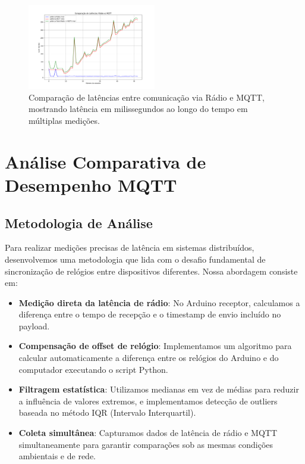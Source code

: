 \documentclass[hidelinks]{sbrt}
\begin{document}
\begin{figure}[H]
  \centering 
  \includegraphics[width=0.5\textwidth]{comparacao_latencias.png}
  \caption{Comparação de latências entre comunicação via Rádio e MQTT, mostrando latência em milissegundos ao longo do tempo em múltiplas medições.}
  \label{fig:comparacao_latencias}
\end{figure}

\section{Análise Comparativa de Desempenho MQTT}
\label{sec:III}

\subsection{Metodologia de Análise}

Para realizar medições precisas de latência em sistemas distribuídos, desenvolvemos uma metodologia que lida com o desafio fundamental de sincronização de relógios entre dispositivos diferentes. Nossa abordagem consiste em:

\begin{itemize}
    \item \textbf{Medição direta da latência de rádio}: No Arduino receptor, calculamos a diferença entre o tempo de recepção e o timestamp de envio incluído no payload.
    
    \item \textbf{Compensação de offset de relógio}: Implementamos um algoritmo para calcular automaticamente a diferença entre os relógios do Arduino e do computador executando o script Python.
    
    \item \textbf{Filtragem estatística}: Utilizamos medianas em vez de médias para reduzir a influência de valores extremos, e implementamos detecção de outliers baseada no método IQR (Intervalo Interquartil).
    
    \item \textbf{Coleta simultânea}: Capturamos dados de latência de rádio e MQTT simultaneamente para garantir comparações sob as mesmas condições ambientais e de rede.
\end{itemize}
\end{document}
